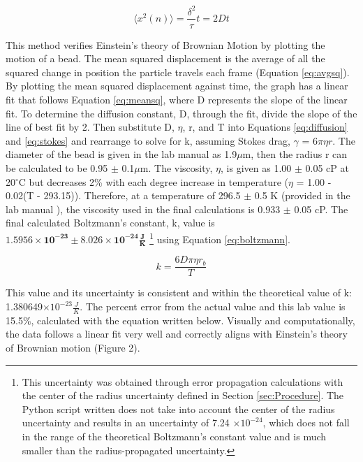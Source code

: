 \documentclass[12pt, letterpaper, twoside]{article}
\begin{document}
\begin{equation*}
    \langle x^2(n) \rangle = \frac{\delta^2}{\tau}t = 2Dt
\end{equation*}

This method verifies Einstein's theory of Brownian Motion by plotting the motion of a bead. The mean squared displacement is the average of all the squared change in position the particle travels each frame (Equation \ref{eq:avgsq}). By plotting the mean squared displacement against time, the graph has a linear fit that follows Equation \ref{eq:meansq}, where D represents the slope of the linear fit. To determine the diffusion constant, D, through the fit, divide the slope of the line of best fit by 2. Then substitute D, $\eta$, r, and T into Equations \ref{eq:diffusion} and \ref{eq:stokes} and rearrange to solve for k, assuming Stokes drag,  $\gamma$ = 6$\pi\eta r$. The diameter of the bead is given in the lab manual \cite{labmanual} as 1.9$\mu$m, then the radius r can be calculated to be 0.95 $\pm$ 0.1$\mu$m. The viscosity, $\eta$, is given as 1.00 $\pm$ 0.05 cP at 20$^\circ$C but decreases 2\% with each degree increase in temperature ($\eta$ = 1.00 - 0.02(T - 293.15)). Therefore, at a temperature of 296.5 $\pm$ 0.5 K (provided in the lab manual \cite{labmanual}), the viscosity used in the final calculations is 0.933 $\pm$ 0.05 cP. The final calculated Boltzmann’s constant, k, value is $\bm{1.5956 \times 10^{-23} \pm 8.026\times 10^{-24} \frac{J}{K}}$ \footnote[1]{This uncertainty was obtained through error propagation calculations with the center of the radius uncertainty defined in Section \ref{sec:Procedure}. The Python script written does not take into account the center of the radius uncertainty and results in an uncertainty of 7.24 $\times 10^{-24}$, which does not fall in the range of the theoretical Boltzmann's constant value and is much smaller than the radius-propagated uncertainty.} using Equation \ref{eq:boltzmann}. 

\begin{equation}
k = \frac{6D\pi\eta r_b}{T} \label{eq:boltzmann}
\end{equation}

This value and its uncertainty is consistent and within the theoretical value of k: 1.380649$\times 10^{-23} \frac{J}{K}$. The percent error from the actual value and this lab value is 15.5\%, calculated with the equation written below. Visually and computationally, the data follows a linear fit very well and correctly aligns with Einstein's theory of Brownian motion (Figure 2).
\end{document}
